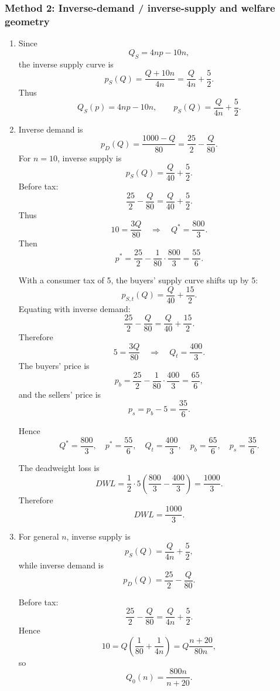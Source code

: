 \documentclass[12pt]{article}
\begin{document}
\newpage
\subsubsection{Method 2: Inverse-demand / inverse-supply and welfare geometry}

\begin{enumerate}[label=(\alph*)]
    \item
    Since
    \[
    Q_S=4np-10n,
    \]
    the inverse supply curve is
    \[
    p_S(Q)=\frac{Q+10n}{4n}=\frac{Q}{4n}+\frac52.
    \]
    Thus
    \[
    \boxed{Q_S(p)=4np-10n,\qquad p_S(Q)=\frac{Q}{4n}+\frac52.}
    \]

    \item
    Inverse demand is
    \[
    p_D(Q)=\frac{1000-Q}{80}=\frac{25}{2}-\frac{Q}{80}.
    \]
    For \(n=10\), inverse supply is
    \[
    p_S(Q)=\frac{Q}{40}+\frac52.
    \]
    Before tax:
    \[
    \frac{25}{2}-\frac{Q}{80}=\frac{Q}{40}+\frac52.
    \]
    Thus
    \[
    10=\frac{3Q}{80}
    \quad\Longrightarrow\quad
    Q^*=\frac{800}{3}.
    \]
    Then
    \[
    p^*=\frac{25}{2}-\frac{1}{80}\cdot \frac{800}{3}=\frac{55}{6}.
    \]

    With a consumer tax of 5, the buyers' supply curve shifts up by 5:
    \[
    p_{S,t}(Q)=\frac{Q}{40}+\frac{15}{2}.
    \]
    Equating with inverse demand:
    \[
    \frac{25}{2}-\frac{Q}{80}=\frac{Q}{40}+\frac{15}{2}.
    \]
    Therefore
    \[
    5=\frac{3Q}{80}
    \quad\Longrightarrow\quad
    Q_t=\frac{400}{3}.
    \]
    The buyers' price is
    \[
    p_b=\frac{25}{2}-\frac{1}{80}\cdot \frac{400}{3}=\frac{65}{6},
    \]
    and the sellers' price is
    \[
    p_s=p_b-5=\frac{35}{6}.
    \]

    Hence
    \[
    \boxed{Q^*=\frac{800}{3},\quad p^*=\frac{55}{6},\quad Q_t=\frac{400}{3},\quad p_b=\frac{65}{6},\quad p_s=\frac{35}{6}.}
    \]

    The deadweight loss is
    \[
    DWL=\frac12\cdot 5\left(\frac{800}{3}-\frac{400}{3}\right)=\frac{1000}{3}.
    \]
    Therefore
    \[
    \boxed{DWL=\frac{1000}{3}.}
    \]

    \item
    For general \(n\), inverse supply is
    \[
    p_S(Q)=\frac{Q}{4n}+\frac52,
    \]
    while inverse demand is
    \[
    p_D(Q)=\frac{25}{2}-\frac{Q}{80}.
    \]

    Before tax:
    \[
    \frac{25}{2}-\frac{Q}{80}=\frac{Q}{4n}+\frac52.
    \]
    Hence
    \[
    10=Q\left(\frac{1}{80}+\frac{1}{4n}\right)
    =Q\frac{n+20}{80n},
    \]
    so
    \[
    Q_0(n)=\frac{800n}{n+20}.
    \]


\end{enumerate}
\end{document}
